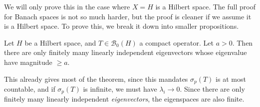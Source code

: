 \documentclass[a4paper]{article}
\begin{document}
We will only prove this in the case where $X = H$ is a Hilbert space. The full proof for Banach spaces is not so much harder, but the proof is cleaner if we assume it is a Hilbert space. To prove this, we break it down into smaller propositions.

\begin{prop}
  Let $H$ be a Hilbert space, and $T \in \mathcal{B}_0(H)$ a compact operator. Let $a > 0$. Then there are only finitely many linearly independent eigenvectors whose eigenvalue have magnitude $\geq a$.
\end{prop}
This already gives most of the theorem, since this mandates $\sigma_p(T)$ is at most countable, and if $\sigma_p(T)$ is infinite, we must have $\lambda_i \to 0$. Since there are only finitely many linearly independent \emph{eigenvectors}, the eigenspaces are also finite.
\end{document}
